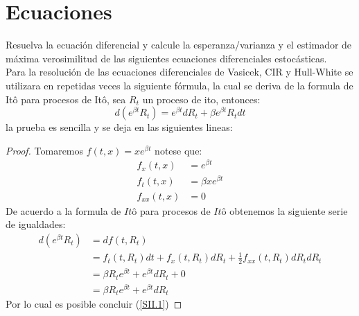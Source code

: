 \documentclass[11pt,notitlepage]{article}
\begin{document}
\section{Ecuaciones} 
    Resuelva la ecuación diferencial y calcule la esperanza/varianza y el estimador de máxima verosimilitud de las siguientes ecuaciones diferenciales estocásticas.\\
    Para la resolución de las ecuaciones diferenciales de Vasicek, CIR y Hull-White se utilizara en repetidas veces la siguiente fórmula, la cual se deriva de 
    la formula de Itô para procesos de Itô, sea \(R_t\) un proceso de ito, entonces: 
    \begin{equation}\label{SII.1}
         d\left(e^{\beta t}R_t \right) = e^{\beta t}dR_t + \beta e^{\beta t}R_tdt
    \end{equation}
    la prueba es sencilla y se deja en las siguientes lineas: 
    \begin{proof}
    Tomaremos \(f(t,x) = xe^{\beta t}\) notese que: 
    \begin{align*}
        f_{x}(t,x) &= e^{\beta t}\\
        f_{t}(t,x) &= \beta xe^{\beta t} \\
        f_{xx}(t,x) &= 0
    \end{align*}
    De acuerdo a la formula de \(Itô\) para procesos de \(Itô\) obtenemos la siguiente serie de igualdades: 
    \begin{align*}
         d\left(e^{\beta t}R_t \right) &= df(t,R_t)\\
                                       &= f_{t}(t,R_t)dt + f_{x}(t,R_t)dR_t + \frac{1}{2}f_{xx}(t,R_t)dR_tdR_t \\
                                       &= \beta R_te^{\beta t} + e^{\beta t}dR_t + 0\\
                                       &= \beta R_te^{\beta t} + e^{\beta t}dR_t
    \end{align*}
    Por lo cual es posible concluir (\ref{SII.1}) 
    \end{proof}
   
\end{document}
